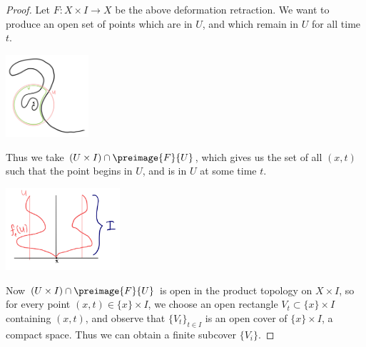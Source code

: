 \documentclass[12pt,letterpaper]{article}
\begin{document}
\begin{enumerate}
\begin{proof}\mbox{}

Let $F:X\times I \to X$ be the above deformation retraction. We want to produce an open set of points which are in $U$, and which remain in $U$ for all time $t$. 

\begin{minipage}{\linewidth}
\begin{center}
\includegraphics[height=1.2in]{hw1-p5-1}
\end{center}
\vspace{-4ex}
\end{minipage}

Thus we take $(U\times I) \cap \preimage{F}{U}$, which gives us the set of all $(x,t)$ such that the point begins in $U$, and is in $U$ at some time $t$. 

\begin{minipage}{\linewidth}
\begin{center}
\includegraphics[height=1.2in]{hw1-p5-2}
\end{center}
\vspace{-4ex}
\end{minipage}

Now $(U\times I) \cap \preimage{F}{U}$ is open in the product topology on $X\times I$, so for every point $(x,t) \in \{x\}\times I$, we choose an open rectangle $V_t\subset \{x\}\times I$ containing $(x,t)$, and observe that $\{V_t\}_{t\in I}$ is an open cover of $\{x\}\times I$, a compact space. Thus we can obtain a finite subcover $\{V_i\}$. 


\end{proof}
\end{enumerate}
\end{document}
